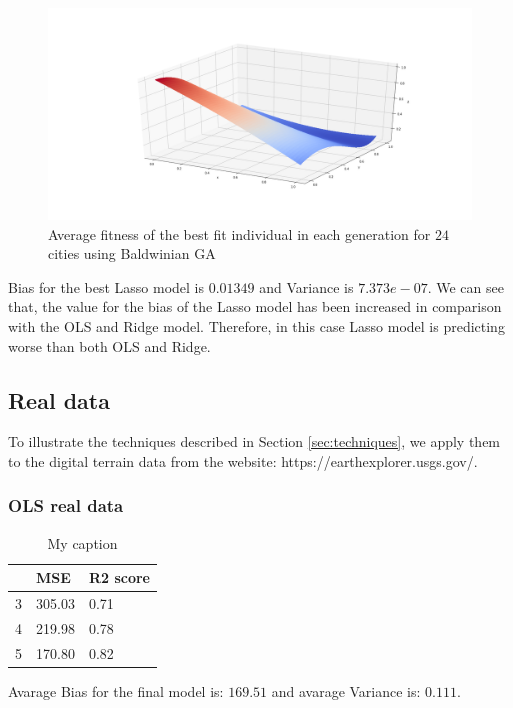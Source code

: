 \documentclass [11pt]{article}
\begin{document}
\begin{figure}[H]
\centering
\includegraphics[width=1\textwidth]{figures/LassoFranke.png}
        \caption{Average fitness of the best fit individual in each generation for $24$ cities using Baldwinian GA}
        \label{fig:LassoFranke}
\end{figure}

Bias for the best Lasso model is $0.01349$ and Variance is $7.373e-07$. We can see that, the value for the bias of the Lasso model has been increased in comparison with the OLS and Ridge model. Therefore, in this case Lasso model is predicting worse than both OLS and Ridge.

\subsection{Real data}
\label{sec:realdata}
To illustrate the techniques described in Section \ref{sec:techniques}, we apply them to the digital terrain data from the website: https://earthexplorer.usgs.gov/.
\subsubsection{OLS real data}

\begin{table}[H]
\centering
\begin{tabular}{lll}
\hline
  & MSE    & R2 score \\ \hline
3 & 305.03 & 0.71      \\
4 & 219.98 & 0.78     \\
5 & 170.80 & 0.82     \\ \hline
\end{tabular}%
\caption{My caption}
\label{tab:olsTerrain}
\end{table}
Avarage Bias for the final model is: $169.51$ and avarage Variance is: $0.111$.
\end{document}
